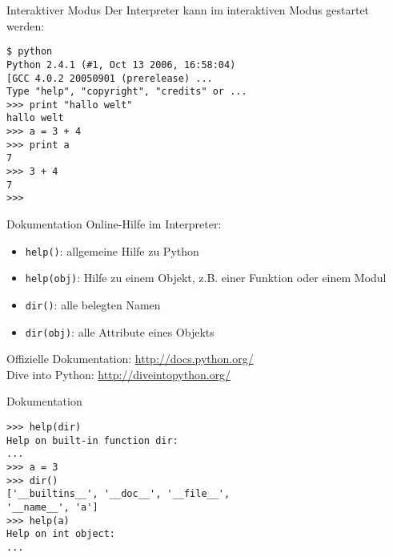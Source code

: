 \begin{frame}[fragile]{Interaktiver Modus}
Der Interpreter kann im interaktiven Modus gestartet werden:
\begin{lstlisting}[style=Shell]
$ python
Python 2.4.1 (#1, Oct 13 2006, 16:58:04)
[GCC 4.0.2 20050901 (prerelease) ...
Type "help", "copyright", "credits" or ...
>>> print "hallo welt"
hallo welt
>>> a = 3 + 4
>>> print a
7
>>> 3 + 4
7
>>>
\end{lstlisting} %
\end{frame}

\begin{frame}{Dokumentation}
Online-Hilfe im Interpreter:
\begin{itemize}
\item \alert{\lstinline{help()}}: allgemeine Hilfe zu Python
\item \alert{\lstinline{help(obj)}}: Hilfe zu einem Objekt, z.B. einer Funktion oder einem Modul
\item \alert{\lstinline{dir()}}: alle belegten Namen 
\item \alert{\lstinline{dir(obj)}}: alle Attribute eines Objekts
\end{itemize}
\vspace{5mm}
Offizielle Dokumentation: \href{http://docs.python.org/}{http://docs.python.org/}\\
\vspace{5mm}
Dive into Python: \href{http://diveintopython.org/}{http://diveintopython.org/}

\end{frame}

\begin{frame}[fragile]{Dokumentation}
\begin{lstlisting}[style=Shell]
>>> help(dir)
Help on built-in function dir:
...
>>> a = 3
>>> dir()
['__builtins__', '__doc__', '__file__', 
'__name__', 'a']
>>> help(a)
Help on int object:
...
\end{lstlisting}
\end{frame}

